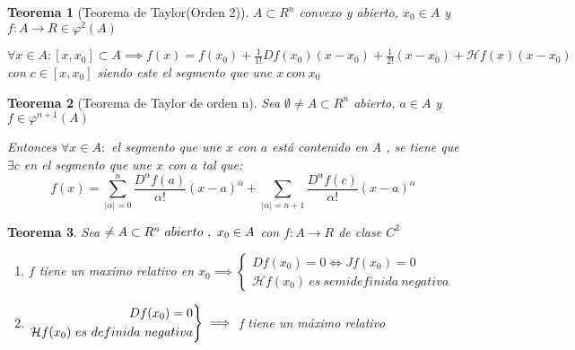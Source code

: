 \documentclass[11pt, a4paper, titlepage]{article}
\theoremstyle{theorem-style}
\newtheorem*{nth}{Teorema}
\theoremstyle{definition-style}
\theoremstyle{remark-style}
\theoremstyle{example-style}
\newenvironment{rcases}
  {\left.\begin{aligned}}
  {\end{aligned}\right\rbrace}
\begin{document}
\begin{nth}[Teorema de Taylor(Orden 2)]

$A \subset R^n$ convexo  y abierto, $x_0 \in A$ y $f:A \to R\in \varphi^2(A)$

$\forall x \in A : [x,x_0] \subset A \implies f(x) = f(x_0) + \frac{1}{1!}Df(x_0)(x-x_0)+ \frac{1}{2!}(x-x_0) + \mathcal{H}f(x)(x-x_0)$ con $c \in [x,x_0]$ siendo este el segmento que une $x \ con \ x_0$

\end{nth}

\begin{nth}[Teorema de Taylor de orden n]
Sea $\emptyset \ne A \subset R^{n}$ abierto, $a\in A$ y $f \in \varphi^{n+1}(A)$

Entonces $\forall x \in A :$ el segmento que une $x$ con $a$ está contenido en A , se tiene que $\exists c $ en el segmento que une $x$ con $a$ tal que:
\[
f(x) = \sum_{|\alpha| = 0}^n \frac{D^\alpha f(a)}{\alpha !}(x-a)^\alpha + \sum_{|\alpha| = n+1}\frac{D^\alpha f(c)}{\alpha !}(x-a)^\alpha
\]

	
\end{nth}

\begin{nth}
Sea $\empty \ne A \subset R^n \ abierto \ , \ x_0 \in A$ con $f:A \to R$ de clase $C^2$
\begin{enumerate}
	\item $f$ tiene un maximo relativo en $x_0 \implies \begin{cases}
	Df(x_0) = 0 \iff Jf(x_0) = 0\\
	\mathcal{H}f(x_0) \ es \ semidefinida \ negativa
\end{cases}$

\item $\begin{rcases}
	Df(x_0) = 0\\
	\mathcal{H}f(x_0) \ es \ definida \ negativa
\end{rcases} \implies $ f tiene un máximo relativo
\end{enumerate}	
\end{nth}
\end{document}
